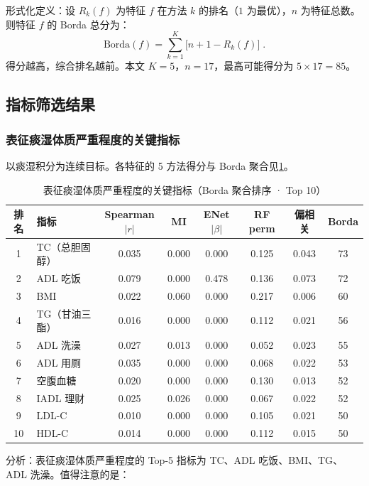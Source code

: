 \documentclass{MathorCupmodeling}
\begin{document}
形式化定义：设 $R_k(f)$ 为特征 $f$ 在方法 $k$ 的排名（$1$ 为最优），$n$ 为特征总数。则特征 $f$ 的 Borda 总分为：
\[
\text{Borda}(f) = \sum_{k=1}^{K} \bigl[ n + 1 - R_k(f) \bigr] \;.
\]
得分越高，综合排名越前。本文 $K=5$，$n=17$，最高可能得分为 $5 \times 17 = 85$。

\subsection{指标筛选结果}

\subsubsection{表征痰湿体质严重程度的关键指标}

以痰湿积分为连续目标。各特征的 5 方法得分与 Borda 聚合见\cref{tab:q1-phlegm}。

\begin{table}[H]
\centering\small
\caption{表征痰湿体质严重程度的关键指标（Borda 聚合排序 · Top 10）}\label{tab:q1-phlegm}
\begin{tabular}{@{}c l c c c c c c@{}}
\toprule
排名 & 指标 & Spearman$|r|$ & MI & ENet$|\beta|$ & RF perm & 偏相关 & Borda \\
\midrule
1  & TC（总胆固醇） & 0.035 & 0.000 & 0.000 & 0.125 & 0.043 & 73 \\
2  & ADL 吃饭     & 0.079 & 0.000 & 0.478 & 0.136 & 0.073 & 72 \\
3  & BMI          & 0.022 & 0.060 & 0.000 & 0.217 & 0.006 & 60 \\
4  & TG（甘油三酯） & 0.016 & 0.000 & 0.000 & 0.112 & 0.021 & 56 \\
5  & ADL 洗澡              & 0.027 & 0.013 & 0.000 & 0.052 & 0.023 & 55 \\
6  & ADL 用厕              & 0.035 & 0.000 & 0.000 & 0.068 & 0.022 & 53 \\
7  & 空腹血糖              & 0.020 & 0.000 & 0.000 & 0.130 & 0.013 & 52 \\
8  & IADL 理财             & 0.025 & 0.026 & 0.000 & 0.067 & 0.022 & 52 \\
9  & LDL-C                 & 0.010 & 0.000 & 0.000 & 0.105 & 0.021 & 50 \\
10 & HDL-C                 & 0.014 & 0.000 & 0.000 & 0.112 & 0.015 & 50 \\
\bottomrule
\end{tabular}
\end{table}

分析：表征痰湿体质严重程度的 Top-5 指标为 TC、ADL 吃饭、BMI、TG、ADL 洗澡。值得注意的是：
\end{document}
